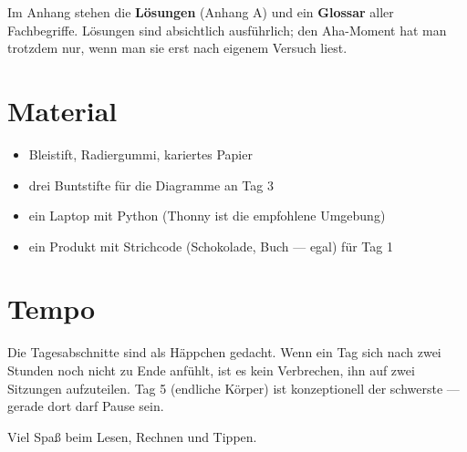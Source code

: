 Im Anhang stehen die \textbf{Lösungen} (Anhang A) und ein
\textbf{Glossar} aller Fachbegriffe. Lösungen sind absichtlich
ausführlich; den Aha-Moment hat man trotzdem nur, wenn man sie erst
nach eigenem Versuch liest.

\section*{Material}

\begin{itemize}
\item Bleistift, Radiergummi, kariertes Papier
\item drei Buntstifte für die Diagramme an Tag 3
\item ein Laptop mit Python (Thonny ist die empfohlene Umgebung)
\item ein Produkt mit Strichcode (Schokolade, Buch — egal) für Tag 1
\end{itemize}

\section*{Tempo}

Die Tagesabschnitte sind als Häppchen gedacht. Wenn ein Tag sich nach
zwei Stunden noch nicht zu Ende anfühlt, ist es kein Verbrechen, ihn
auf zwei Sitzungen aufzuteilen. Tag 5 (endliche Körper) ist
konzeptionell der schwerste — gerade dort darf Pause sein.

Viel Spaß beim Lesen, Rechnen und Tippen.
